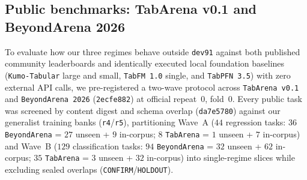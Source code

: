 \subsection{Public benchmarks: TabArena v0.1 and BeyondArena 2026}
\label{sec:blackhole-public-benchmarks}

To evaluate how our three regimes behave outside \texttt{dev91} against both published community leaderboards and
identically executed local foundation baselines (\texttt{Kumo-Tabular} large and small, \texttt{TabFM 1.0} single, and
\texttt{TabPFN 3.5}) with zero external API calls, we pre-registered a two-wave protocol across \texttt{TabArena v0.1}
\citep{erickson2025tabarena} and \texttt{BeyondArena 2026} (\texttt{2ecfe882}) at official repeat~0, fold~0. Every
public task was screened by content digest and schema overlap (\texttt{da7e5780}) against our generalist training banks
(\texttt{r4}/\texttt{r5}), partitioning Wave~A ($44$ regression tasks: $36$ \texttt{BeyondArena} = $27$ unseen + $9$
in-corpus; $8$ \texttt{TabArena} = $1$ unseen + $7$ in-corpus) and Wave~B ($129$ classification tasks: $94$
\texttt{BeyondArena} = $32$ unseen + $62$ in-corpus; $35$ \texttt{TabArena} = $3$ unseen + $32$ in-corpus) into
single-regime slices while excluding sealed overlaps (\texttt{CONFIRM}/\texttt{HOLDOUT}).

